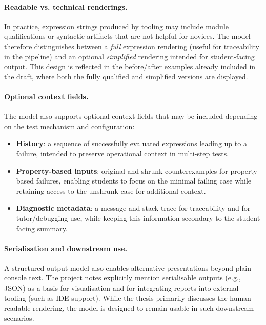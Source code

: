 \paragraph{Readable vs. technical renderings.}
    \label{Readable vs. technical renderings.}
In practice, expression strings produced by tooling
may include module qualifications or syntactic artifacts that are not helpful for novices.
The model therefore distinguishes between a \emph{full} expression rendering (useful for
traceability in the pipeline) and an optional \emph{simplified} rendering intended for
student-facing output. This design is reflected in the before/after examples already included in
the draft, where both the fully qualified and simplified versions are displayed.


\paragraph{Optional context fields.}
    \label{Optional context fields.}
The model also supports optional context fields that may be
included depending on the test mechanism and configuration:

\begin{itemize}
    \item \textbf{History}: a sequence of successfully evaluated expressions leading up to a
        failure, intended to preserve operational context in multi-step tests.
    \item \textbf{Property-based inputs}: original and shrunk counterexamples for property-based
        failures, enabling students to focus on the minimal failing case while retaining access to
        the unshrunk case for additional context.
    \item \textbf{Diagnostic metadata}: a message and stack trace for traceability and for
        tutor/debugging use, while keeping this information secondary to the student-facing summary.
\end{itemize}


\paragraph{Serialisation and downstream use.}
    \label{Serialisation and downstream use.}
A structured output model also enables alternative
presentations beyond plain console text. The project notes explicitly mention serialisable outputs
(e.g., JSON) as a basis for visualisation and for integrating reports into external tooling
(such as IDE support). While the thesis primarily discusses the human-readable rendering,
the model is designed to remain usable in such downstream scenarios.



